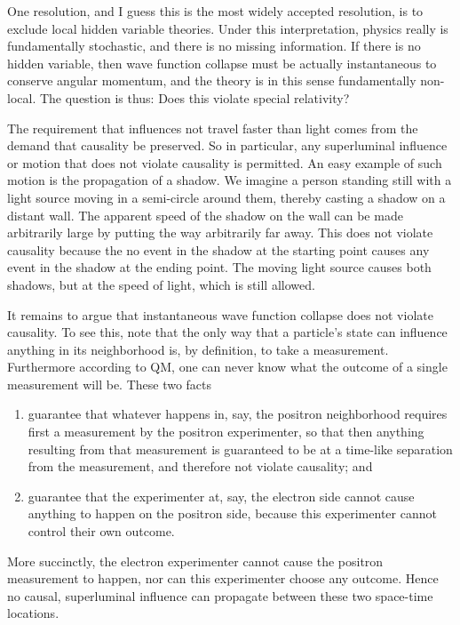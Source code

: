One resolution, and I guess this is the most widely accepted resolution,
is to exclude local hidden variable theories. Under this interpretation,
physics really is fundamentally stochastic, and there is no missing
information. If there is no hidden variable, then wave function collapse
must be actually instantaneous to conserve angular momentum, and the
theory is in this sense fundamentally non-local. The question is thus:
Does this violate special relativity?

The requirement that influences not travel faster than light comes from
the demand that causality be preserved. So in particular, any
superluminal influence or motion that does not violate causality is
permitted. An easy example of such motion is the propagation of a shadow.
We imagine a person standing still with a light source moving in a semi-circle
around them, thereby casting a shadow on a distant wall. The apparent
speed of the shadow on the wall can be made arbitrarily large by putting
the way arbitrarily far away. This does not violate causality because the
no event in the shadow at the starting point causes any event in the
shadow at the ending point. The moving light source causes both shadows,
but at the speed of light, which is still allowed.

It remains to argue that instantaneous wave function collapse does not violate
causality. To see this, note that the only way that a particle's state
can influence anything in its neighborhood is, by definition, to take a
measurement. Furthermore according to QM, one can never know what the
outcome of a single measurement will be. These two facts
\begin{enumerate}
  \item guarantee that whatever happens in, say, the positron neighborhood
        requires first a measurement by the positron experimenter, so that
        then anything resulting from that measurement is guaranteed to
        be at a time-like separation from the measurement, and therefore 
        not violate causality; and
  \item guarantee that the experimenter at, say, the electron side cannot
        cause anything to happen on the positron side, because this
        experimenter cannot control their own outcome.
\end{enumerate}
More succinctly, the electron experimenter cannot cause the positron
measurement to happen, nor can this experimenter choose any outcome.
Hence no causal, superluminal influence can propagate between 
these two space-time locations.

